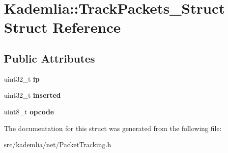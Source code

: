 \section{Kademlia::TrackPackets\_\-Struct Struct Reference}
\label{structKademlia_1_1TrackPackets__Struct}
\subsection*{Public Attributes}
\begin{DoxyCompactItemize}
\item 
uint32\_\-t {\bfseries ip}\label{structKademlia_1_1TrackPackets__Struct_a999b44998d05997703a4c14784b5115f}

\item 
uint32\_\-t {\bfseries inserted}\label{structKademlia_1_1TrackPackets__Struct_a3d91c681a39fff6de0b8c839966abdaa}

\item 
uint8\_\-t {\bfseries opcode}\label{structKademlia_1_1TrackPackets__Struct_a7d043a962cc3523bcbe1124e6b02959e}

\end{DoxyCompactItemize}


The documentation for this struct was generated from the following file:\begin{DoxyCompactItemize}
\item 
src/kademlia/net/PacketTracking.h\end{DoxyCompactItemize}
